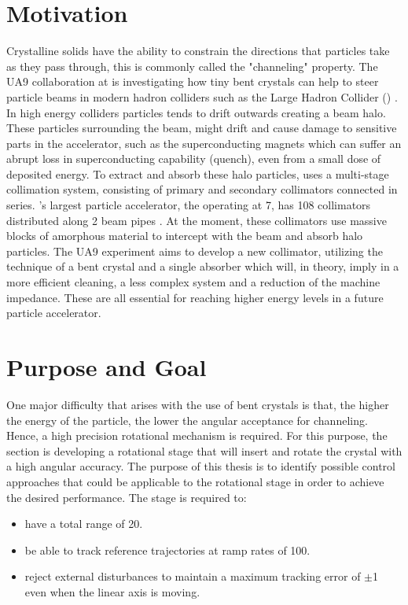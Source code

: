 \section{Motivation}
Crystalline solids have the ability to constrain the directions that particles take as they pass through, this is commonly called the "channeling" property. The UA9 collaboration at \abbrCERN is investigating how tiny bent crystals can help to steer particle beams in modern hadron colliders such as the Large Hadron Collider (\abbrLHC) \citep{WebsiteUA9:2016}. In high energy colliders particles tends to drift outwards creating a beam halo. These particles surrounding the beam, might drift and cause damage to sensitive parts in the accelerator, such as the superconducting magnets which can suffer an abrupt loss in superconducting capability (quench), even from a small dose of deposited energy. To extract and absorb these halo particles, \abbrCERN uses a multi-stage collimation system, consisting of primary and secondary collimators connected in series. \abbrCERN's largest particle accelerator, the \abbrLHC operating at \unit{7}{\tera\electronvolt}, has 108 collimators distributed along 2 beam pipes \citep{CrystalCollimation:2015}. At the moment, these collimators use massive blocks of amorphous material to intercept with the beam and absorb halo particles. The UA9 experiment aims to develop a new collimator, utilizing the technique of a bent crystal and a single absorber which will, in theory, imply in a more efficient cleaning, a less complex system and a reduction of the machine impedance. These are all essential for reaching higher energy levels in a future particle accelerator.

\section{Purpose and Goal}
One major difficulty that arises with the use of bent crystals is that, the higher the energy of the particle, the lower the angular acceptance for channeling. Hence, a high precision rotational mechanism is required. For this purpose, the \abbrENSTIECE section is developing a rotational stage that will insert and rotate the crystal with a high angular accuracy. The purpose of this thesis is to identify possible control approaches that could be applicable to the rotational stage in order to achieve the desired performance. The stage is required to:
\begin{itemize}
  \item have a total range of \unit{20}{\milli\rad}.
  \item be able to track reference trajectories at ramp rates of \unit{100}{\micro\radianpersecond}.
  \item reject external disturbances to maintain a maximum tracking error of $\pm$\unit{1}{\micro\rad} even when the linear axis is moving.
\end{itemize}

